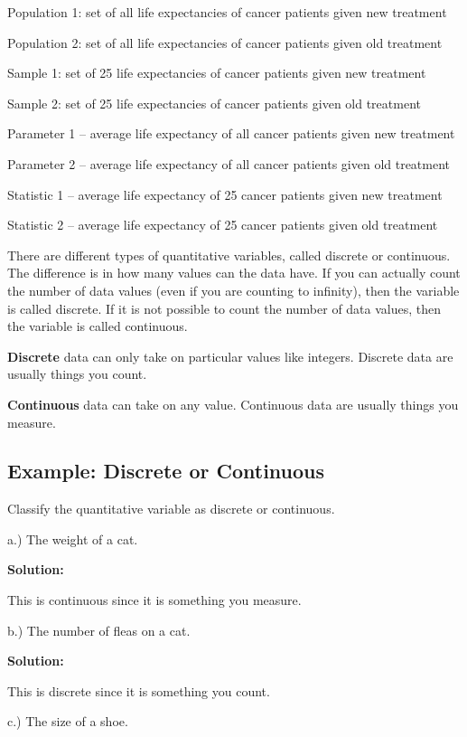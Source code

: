 \documentclass[]{book}
\begin{document}
Population 1: set of all life expectancies of cancer patients given new treatment

Population 2: set of all life expectancies of cancer patients given old treatment

Sample 1: set of 25 life expectancies of cancer patients given new treatment

Sample 2: set of 25 life expectancies of cancer patients given old treatment

Parameter 1 -- average life expectancy of all cancer patients given new treatment

Parameter 2 -- average life expectancy of all cancer patients given old treatment

Statistic 1 -- average life expectancy of 25 cancer patients given new treatment

Statistic 2 -- average life expectancy of 25 cancer patients given old treatment

There are different types of quantitative variables, called discrete or continuous. The difference is in how many values can the data have. If you can actually count the number of data values (even if you are counting to infinity), then the variable is called discrete. If it is not possible to count the number of data values, then the variable is called continuous.

\textbf{Discrete} data can only take on particular values like integers. Discrete data are usually things you count.

\textbf{Continuous} data can take on any value. Continuous data are usually things you measure.

\hypertarget{example-discrete-or-continuous}{%
\subsection{Example: Discrete or Continuous}\label{example-discrete-or-continuous}}

Classify the quantitative variable as discrete or continuous.

a.) The weight of a cat.

\textbf{Solution:}

This is continuous since it is something you measure.

b.) The number of fleas on a cat.

\textbf{Solution:}

This is discrete since it is something you count.

c.) The size of a shoe.
\end{document}
